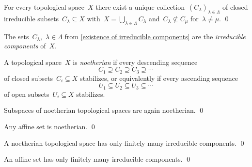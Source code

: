 \begin{proposition}
  \label{existence of irreducible components}
  For every topological space~$X$ there exist a unique collection~$( C_\lambda )_{\lambda \in \Lambda}$ of closed irreducible subsets~$C_\lambda \subseteq X$ with~$X = \bigcup_{\lambda \in \Lambda} C_\lambda$ and~$C_\lambda \nsubseteq C_\mu$ for~$\lambda \neq \mu$.
  \qed
\end{proposition}


\begin{definition}
  The sets~$C_\lambda$,~$\lambda \in \Lambda$ from \cref{existence of irreducible components} are the \emph{irreducible components} of~$X$.
\end{definition}


\begin{definition}
  A topological space~$X$ is \emph{noetherian} if every descending sequence
  \[
              C_1
    \supseteq C_2
    \supseteq C_3
    \supseteq \dotsb
  \]
  of closed subsets~$C_i \subseteq X$ stabilizes, or equivalently if every ascending sequence
  \[
              U_1
    \subseteq U_2
    \subseteq U_3
    \subseteq \dotsb
  \]
  of open subsets~$U_i \subseteq X$ stabilizes.
\end{definition}


\begin{lemma}
  Subspaces of noetherian topological spaces are again noetherian.
  \qed
\end{lemma}


\begin{lemma}
  Any affine set is noetherian.
  \qed
\end{lemma}


\begin{lemma}
  A noetherian topological space has only finitely many irreducible components.
  \qed
\end{lemma}


\begin{corollary}
  An affine set has only finitely many irreducible components.
  \qed
\end{corollary}


